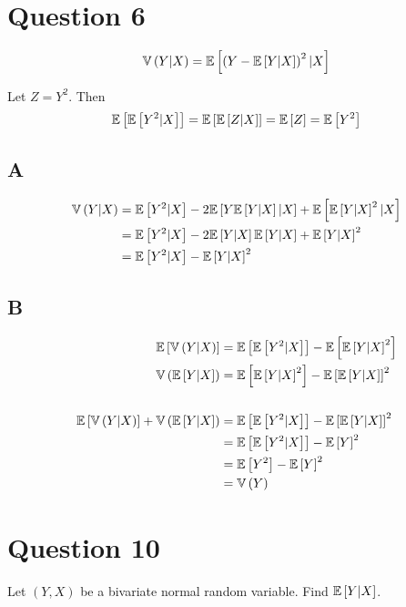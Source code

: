 \documentclass[12pt]{paper}
\begin{document}
\section{Question 6}

\begin{equation*}
  \Vari{ Y \vert X} = \exV{ \left( Y - \exV{Y \vert X} \right)^2 \vert X}
\end{equation*}

Let $Z = Y^2$. Then
\begin{equation*}
\exV{\exV{Y^2 \vert X}} = \exV{\exV{Z \vert X}}= \exV{Z} = \exV{Y^2}  
\end{equation*}

\subsection{A}

\begin{align*}
  \Vari{ Y \vert X} &= \exV{ Y^2 \vert X } - 2  \exV{ Y \exV{ Y \vert X} \vert X} +
                  \exV{\exV{Y \vert X}^2\vert X}\\
                &= \exV{ Y^2 \vert X} - 2 \exV{ Y \vert X} \exV{ Y \vert X} + \exV{Y \vert X}^2\\
  &= \exV{Y^2 \vert X} - \exV{Y \vert X}^2
\end{align*}

\subsection{B}

\begin{align*}
  \exV{\Vari{Y\vert X}} &= \exV{ \exV{ Y^2 | X}} - \exV{\exV{ Y \vert X}^2}\\
  \Vari{\exV{Y\vert X}} &= \exV{\exV{Y \vert X}^2} - \exV{\exV{Y\vert X}}^2\\
  \\
  \exV{\Vari{Y\vert X}} + \Vari{\exV{Y\vert X}} &= \exV{ \exV{Y^2 \vert X}} -
                                       \exV{\exV{Y\vert X}}^2\\
                   &= \exV{\exV{Y^2 \vert X}} - \exV{Y}^2\\
                   &=\exV{Y^2} - \exV{Y}^2\\
                   &= \Vari{Y}
\end{align*}

\section{Question 10}
Let $(Y,X)$ be a bivariate normal random variable. Find $\exV{Y \vert
  X}$. \newline \newline
\end{document}
